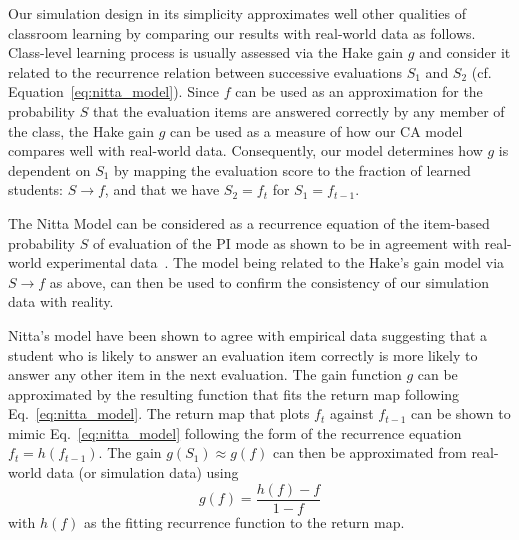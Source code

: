 \documentclass[twocolumn,secnumarabic,amssymb, nobibnotes, aps, prd]{revtex4-2}
\begin{document}
    Our simulation design in its simplicity approximates well other qualities of classroom learning by comparing our results with real-world data as follows.
    Class-level learning process is usually assessed via the Hake gain $g$ and consider it related to the recurrence relation between successive evaluations $S_1$ and $S_2$ (cf. Equation~\ref{eq:nitta_model}).
    Since $f$ can be used as an approximation for the probability $S$ that the evaluation items are answered correctly by any member of the class, the Hake gain $g$ can be used as a measure of how our CA model compares well with real-world data.
    Consequently, our model determines how $g$ is dependent on $S_1$ by mapping the evaluation score to the fraction of learned students: ${S}\rightarrow{f}$, and that we have $S_2=f_{t}$ for $S_1=f_{t-1}$.

    The Nitta Model can be considered as a recurrence equation of the item-based probability $S$ of evaluation of the PI mode as shown to be in agreement with real-world experimental data~\cite{nitta2019mathematical}.
    The model being related to the Hake's gain model via ${S}\rightarrow{f}$ as above, can then be used to confirm the consistency of our simulation data with reality.
    
    Nitta's model have been shown to agree with empirical data suggesting that a student who is likely to answer an evaluation item correctly is more likely to answer any other item in the next evaluation.
    The gain function $g$ can be approximated by the resulting function that fits the return map following Eq.~\ref{eq:nitta_model}.
    The return map that plots $f_{t}$ against $f_{t-1}$ can be shown to mimic Eq.~\ref{eq:nitta_model} following the form of the recurrence equation $f_{t} = h(f_{t-1})$.
    The gain $g(S_1)\approx g(f)$ can then be approximated from real-world data (or simulation data) using
    \begin{equation}\label{eq:gain-from-return-map}
    g(f) = \frac{h(f) - f}{1 - f}
    \end{equation}
    with $h(f)$ as the fitting recurrence function to the return map.
\end{document}
